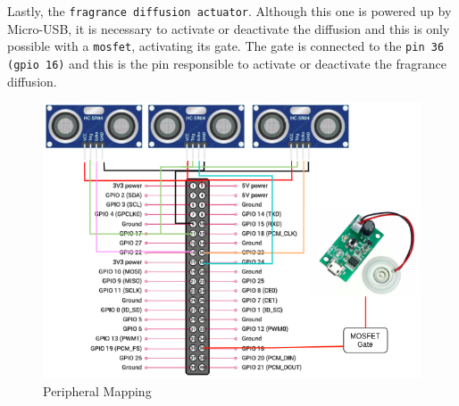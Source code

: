 Lastly, the \texttt{fragrance diffusion actuator}. Although this one is powered up by Micro-USB, it is necessary to activate or deactivate the diffusion and this is only possible with a \texttt{\gls{mosfet}}, activating its gate. The gate is connected to the \texttt{pin 36 (\gls{gpio} 16)} and this is the pin responsible to activate or deactivate the fragrance diffusion.
%
\begin{figure}[htb!]
\centering
    \includegraphics[width=0.8\columnwidth]{./img/hw-pinout.png}
  \caption{Peripheral Mapping}%
\label{fig:peripheral-mapping}
\end{figure}

% 
% 
%  
